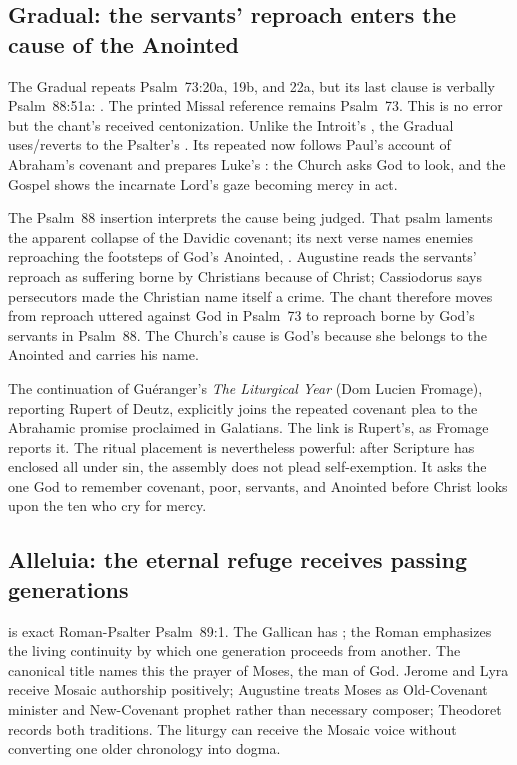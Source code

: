 \subsection*{Gradual: the servants' reproach enters the cause of the Anointed\enspace{}}

The Gradual repeats Psalm~73:20a, 19b, and 22a, but its last clause is verbally
Psalm~88:51a: . The printed Missal
reference remains Psalm~73. This is no error but the chant's received
centonization. Unlike the Introit's , the
Gradual uses/reverts to the Psalter's . Its repeated
 now follows Paul's account of Abraham's covenant and prepares
Luke's : the Church asks God to look, and the Gospel shows
the incarnate Lord's gaze becoming mercy in act.

The Psalm~88 insertion interprets the cause being judged. That psalm laments
the apparent collapse of the Davidic covenant; its next verse names enemies
reproaching the footsteps of God's Anointed, .
Augustine reads the servants' reproach as suffering borne by Christians
because of Christ; Cassiodorus says persecutors made the Christian name itself
a crime. The chant therefore moves from reproach uttered against God in
Psalm~73 to reproach borne by God's servants in Psalm~88. The Church's cause is
God's because she belongs to the Anointed and carries his name.

The continuation of Guéranger's \emph{The Liturgical Year} (Dom Lucien Fromage),
reporting Rupert of Deutz, explicitly joins the repeated covenant
plea to the Abrahamic promise proclaimed in Galatians. The link is Rupert's,
as Fromage reports it.
The ritual placement is nevertheless powerful: after Scripture has enclosed
all under sin, the assembly does not plead self-exemption. It asks the one God
to remember covenant, poor, servants, and Anointed before Christ looks upon the
ten who cry for mercy.

\subsection*{Alleluia: the eternal refuge receives passing generations\enspace{}}

 is exact
Roman-Psalter Psalm~89:1. The Gallican has ;
the Roman  emphasizes the living continuity by which one
generation proceeds from another. The canonical title names this the prayer
of Moses, the man of God. Jerome and Lyra receive Mosaic authorship positively;
Augustine treats Moses as Old-Covenant minister and New-Covenant prophet rather
than necessary composer; Theodoret records both traditions. The liturgy can
receive the Mosaic voice without converting one older chronology into dogma.

